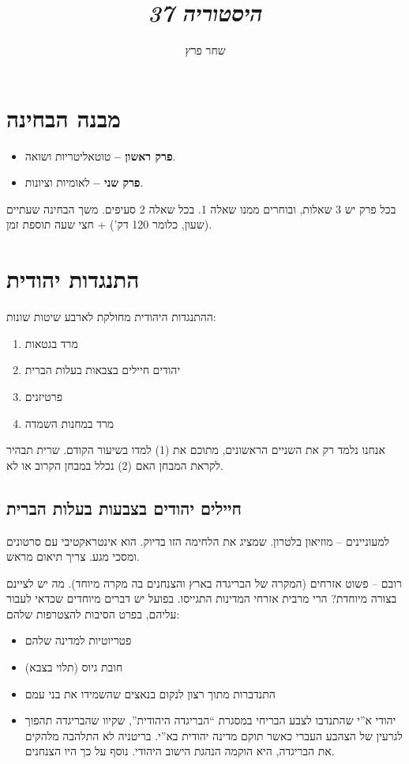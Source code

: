 \documentclass[]{article}
\author{שחר פרץ}
\title{\textit{היסטוריה 37}}
\begin{document}
	\maketitle
	
	\section{מבנה הבחינה}
	\begin{itemize}
		\item \textbf{פרק ראשון – }טוטאליטריות ושואה. 
		\item \textbf{פרק שני – }לאומיות וציונות. 
	\end{itemize}
	בכל פרק יש 3 שאלות, ובוחרים ממנו שאלה 1. בכל שאלה 2 סעיפים. משך הבחינה שעתיים (שעון, כלומר 120 דק') + חצי שעה תוספת זמן. 
	
	\section{התנגדות יהודית}
	ההתנגדות היהודית מחולקת לארבע שיטות שונות: 
	\begin{enumerate}
		\item מרד בגטאות
		\item יהודים חיילים בצבאות בעלות הברית
		\item פרטיזנים
		\item מרד במחנות השמדה
	\end{enumerate}
	אנחנו נלמד רק את השניים הראשונים, מתוכם את (1) למדו בשיעור הקודם. שרית תבהיר לקראת המבחן האם (2) נכלל במבחן הקרוב או לא. 
	
	\subsection{חיילים יהודים בצבעות בעלות הברית}
	למעוניינים – מוזיאון בלטרון. שמציג את הלחימה הזו בדיוק. הוא אינטראקטיבי עם סרטונים ומסכי מגע. צריך תיאום מראש. 
	
	רובם – פשוט אזרחים (המקרה של הבריגדה בארץ והצנחנים בה מקרה מיוחד). מה יש לציינם בצורה מיוחדת? הרי מרבית אזרחי המדינות התגייסו. בפועל יש דברים מיוחדים שכדאי לעבור עליהם, בפרט הסיבות להצטרפות שלהם: 
	\begin{itemize}
		\item פטריוטיות למדינה שלהם
		\item חובת גיוס (תלוי בצבא)
		\item התנדברות מתוך רצון לנקום בנאצים שהשמידו את בני עמם
		\item יהודי א''י שהתנדבו לצבע הבריחי במסגרת ``הבריגדה היהודית'', שקיוו שהבריגדה תהפוך לגרעין של הצהבע העברי כאשר תוקם מדינה יהודית בא''י. בריטניה לא התלהבה מלהקים את הבריגדה, היא הוקמה הנהגת הישוב היהודי. נוסף על כך היו הצנחנים. 
		
		
	\end{itemize}
	
\end{document}
